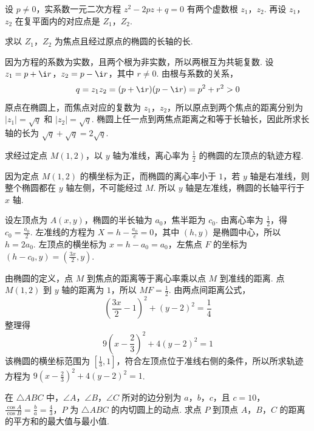 \begin{problem}

设 \(p \neq 0\)，实系数一元二次方程 \(z^2 - 2pz + q = 0\) 有两个虚数根 \(z_1\)，\(z_2\). 再设 \(z_1\)，\(z_2\) 在复平面内的对应点是 \(Z_1\)，\(Z_2\).

求以 \(Z_1\)，\(Z_2\) 为焦点且经过原点的椭圆的长轴的长.
\end{problem}

\begin{solution}
因为方程的系数为实数，且两个根为非实数，所以两根互为共轭复数. 设 \(z_1=p+\i r\)，\(z_2=p-\i r\)，其中 \(r\neq0\). 由根与系数的关系，
\[
q=z_1z_2=(p+\i r)(p-\i r)=p^2+r^2>0
\]
原点在椭圆上，而焦点对应的复数为 \(z_1\)，\(z_2\)，所以原点到两个焦点的距离分别为 \(\lvert z_1\rvert=\sqrt{q}\) 和 \(\lvert z_2\rvert=\sqrt{q}\). 椭圆上任一点到两焦点距离之和等于长轴长，因此所求长轴的长为 \(\sqrt q+\sqrt q=2\sqrt q\).
\end{solution}

\begin{problem}

求经过定点 \(M\left(1,2\right)\)，以 \(y\) 轴为准线，离心率为 \(\frac{1}{2}\) 的椭圆的左顶点的轨迹方程.
\end{problem}

\begin{solution}
因为定点 \(M(1,2)\) 的横坐标为正，而椭圆的离心率小于 \(1\)，若 \(y\) 轴是右准线，则整个椭圆都在 \(y\) 轴左侧，不可能经过 \(M\). 所以 \(y\) 轴是左准线，椭圆的长轴平行于 \(x\) 轴.

设左顶点为 \(A(x,y)\)，椭圆的半长轴为 \(a_0\)，焦半距为 \(c_0\). 由离心率为 \(\frac12\)，得 \(c_0=\frac{a_0}{2}\). 左准线的方程为 \(X=h-\frac{a_0}{e}=0\)，其中 \((h,y)\) 是椭圆中心，所以 \(h=2a_0\). 左顶点的横坐标为 \(x=h-a_0=a_0\)，左焦点 \(F\) 的坐标为 \(\left(h-c_0,y\right)=\left(\frac{3x}{2},y\right)\).

由椭圆的定义，点 \(M\) 到焦点的距离等于离心率乘以点 \(M\) 到准线的距离. 点 \(M(1,2)\) 到 \(y\) 轴的距离为 \(1\)，所以 \(MF=\frac12\). 由两点间距离公式，
\[
\left(\frac{3x}{2}-1\right)^2+(y-2)^2=\frac14
\]
整理得
\[
9\left(x-\frac23\right)^2+4(y-2)^2=1
\]
该椭圆的横坐标范围为 \(\left[\frac13,1\right]\)，符合左顶点位于准线右侧的条件，所以所求轨迹方程为 \(9\left(x-\frac23\right)^2+4(y-2)^2=1\).
\end{solution}

\begin{problem}

在 \(\triangle ABC\) 中，\(\angle A\)，\(\angle B\)，\(\angle C\) 所对的边分别为 \(a\)，\(b\)，\(c\)，且 \(c = 10\)，\(\frac{\cos A}{\cos B} = \frac{b}{a} = \frac{4}{3}\)，\(P\) 为 \(\triangle ABC\) 的内切圆上的动点. 求点 \(P\) 到顶点 \(A\)，\(B\)，\(C\) 的距离的平方和的最大值与最小值.
\end{problem}

